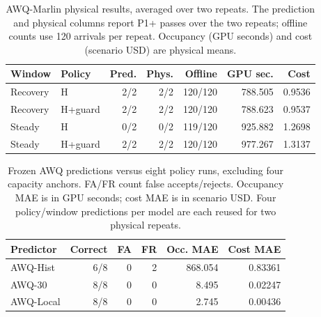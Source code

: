 \begin{table}[t]
\centering
\small
\caption{AWQ-Marlin physical results, averaged over two repeats. The prediction
and physical columns report P1+ passes over the two repeats; offline counts use
120 arrivals per repeat. Occupancy (GPU seconds) and cost (scenario USD) are physical means.}
\label{tab:awq-results}
\setlength{\tabcolsep}{2pt}
\par\vspace{4pt}
\begin{tabular*}{\linewidth}{@{\extracolsep{\fill}}llrrrrr@{}}
\toprule
Window & Policy & Pred. & Phys. & Offline & GPU sec. & Cost\\
\midrule
Recovery & H & 2/2 & 2/2 & 120/120 & 788.505 & 0.9536\\
Recovery & H+guard & 2/2 & 2/2 & 120/120 & 788.623 & 0.9537\\
Steady & H & 0/2 & 0/2 & 119/120 & 925.882 & 1.2698\\
Steady & H+guard & 2/2 & 2/2 & 120/120 & 977.267 & 1.3137\\
\bottomrule
\end{tabular*}
\end{table}

\begin{table}[t]
\centering
\small
\caption{Frozen AWQ predictions versus eight policy runs, excluding four
capacity anchors. FA/FR count false accepts/rejects. Occupancy MAE is in GPU
seconds; cost MAE is in scenario USD. Four policy/window predictions per model
are each reused for two physical repeats.}
\label{tab:awq-predictors}
\setlength{\tabcolsep}{2pt}
\par\vspace{4pt}
\begin{tabular*}{\linewidth}{@{\extracolsep{\fill}}lrrrrr@{}}
\toprule
Predictor & Correct & FA & FR & Occ. MAE & Cost MAE\\
\midrule
AWQ-Hist & 6/8 & 0 & 2 & 868.054 & 0.83361\\
AWQ-30 & 8/8 & 0 & 0 & 8.495 & 0.02247\\
AWQ-Local & 8/8 & 0 & 0 & 2.745 & 0.00436\\
\bottomrule
\end{tabular*}
\end{table}

